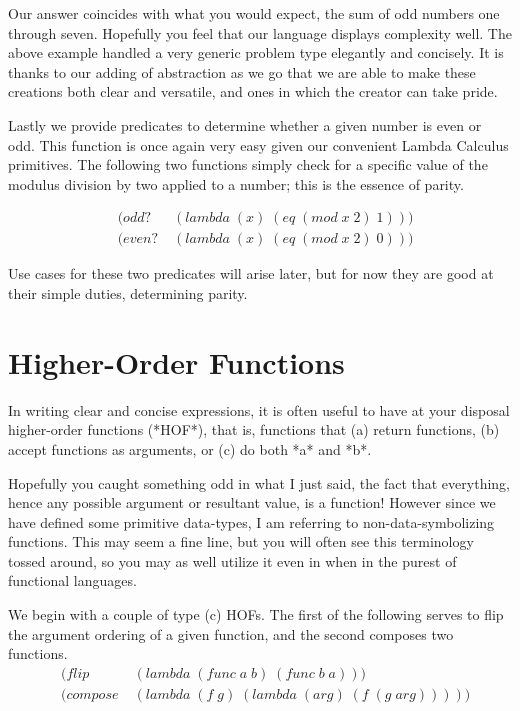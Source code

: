 Our answer coincides with what you would expect, the sum of odd numbers one 
through seven. Hopefully you feel that our language displays complexity well. The 
above example handled a very generic problem type elegantly and concisely. It is 
thanks to our adding of abstraction as we go that we are able to make these 
creations both clear and versatile, and ones in which the creator can take pride.

Lastly we provide predicates to determine whether a given number is even or odd. 
This function is once again very easy given our convenient Lambda Calculus 
primitives. The following two functions simply check for a specific value of the 
modulus division by two applied to a number; this is the essence of parity.

\begin{align*}
& (odd? \; &(lambda \; (x) \; (eq \; (mod \; x \; 2) \; 1)))
\\& (even? \; &(lambda \; (x) \; (eq \; (mod \; x \; 2) \; 0)))
\end{align*}

Use cases for these two predicates will arise later, but for now they are good at 
their simple duties, determining parity.

\section{Higher-Order Functions}
In writing clear and concise expressions, it is often useful to have at your 
disposal higher-order functions (*HOF*), that is, functions that (a) return 
functions, (b) accept functions as arguments, or (c) do both *a* and *b*.

Hopefully you caught something odd in what I just said, the fact that everything, 
hence any possible argument or resultant value, is a function! However since we 
have defined some primitive data-types, I am referring to non-data-symbolizing 
functions. This may seem a fine line, but you will often see this terminology 
tossed around, so you may as well utilize it even in when in the purest of 
functional languages.

We begin with a couple of type (c) HOFs. The first of the following serves to flip 
the argument ordering of a given function, and the second composes two functions.
\begin{align*}
& (flip \; &(lambda \; (func \; a \; b) \; (func \; b \; a)))
\\& (compose \; &(lambda \; (f \; g) \; (lambda \; (arg) \; (f \; (g \; arg)))))
\end{align*}

